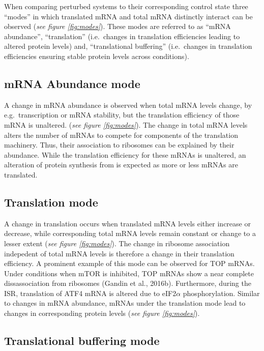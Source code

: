 \documentclass[12pt,openany]{book}
\begin{document}
When comparing perturbed systems to their corresponding control state
three ``modes'' in which translated mRNA and total mRNA distinctly
interact can be observed (\emph{see figure \ref{fig:modes}}). These
modes are referred to as ``mRNA abundance'', ``translation''
(i.e.~changes in translation efficiencies leading to altered protein
levels) and, ``translational buffering'' (i.e.~changes in translation
efficiencies ensuring stable protein levels across conditions).

\subsection{mRNA Abundance mode}

A change in mRNA abundance is observed when total mRNA levels change, by
e.g.~transcription or mRNA stability, but the translation efficiency of
those mRNA is unaltered. (\emph{see figure \ref{fig:modes}}). The change
in total mRNA levels alters the number of mRNAs to compete for
components of the translation machinery. Thus, their association to
ribosomes can be explained by their abundance. While the translation
efficiency for these mRNAs is unaltered, an alteration of protein
synthesis from is expected as more or less mRNAs are translated.

\subsection{Translation mode}

A change in translation occurs when translated mRNA levels either
increase or decrease, while corresponding total mRNA levels remain
constant or change to a lesser extent (\emph{see figure
\ref{fig:modes}}). The change in ribosome association indepedent of
total mRNA levels is therefore a change in their translation efficiency.
A prominent example of this mode can be observed for TOP mRNAs. Under
conditions when mTOR is inhibited, TOP mRNAs show a near complete
dissassociation from ribosomes (Gandin et al., 2016b). Furthermore,
during the ISR, translation of ATF4 mRNA is altered due to
eIF2\(\alpha\) phosphorylation. Similar to changes in mRNA abundance,
mRNAs under the translation mode lead to changes in corresponding
protein levels (\emph{see figure \ref{fig:modes}}).

\subsection{Translational buffering mode} \label{modeBuffering}
\end{document}
